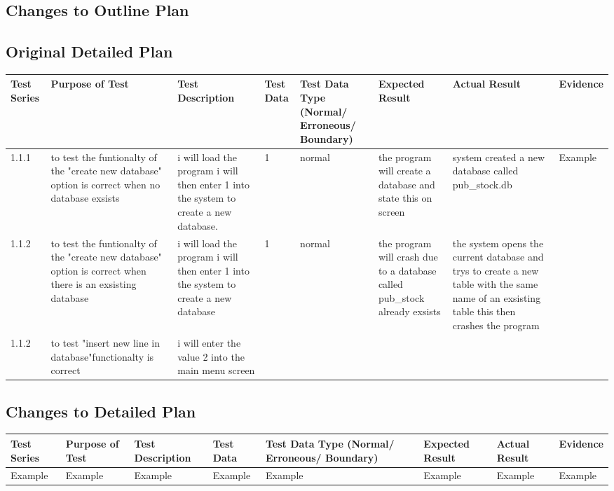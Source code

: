 \begin{landscape}
\subsection{Changes to Outline Plan}

\subsection{Original Detailed Plan}

\begin{center}
    \begin{longtable}{|p{1.5cm}|p{2.5cm}|p{2.5cm}|p{2cm}|p{2cm}|p{2cm}|p{2cm}|p{2cm}|}
        \hline
        \textbf{Test Series} & \textbf{Purpose of Test} & \textbf{Test Description} & \textbf{Test Data} & \textbf{Test Data Type (Normal/ Erroneous/ Boundary)} & \textbf{Expected Result} & \textbf{Actual Result} & \textbf{Evidence}\\ \hline
       1.1.1 & to test the funtionalty of the "create new database" option is correct when no database exsists & i will load the program i will then enter 1 into the system to create a new database. & 1 & normal & the program will create a database and state this on screen &system created a new database called pub_stock.db & Example \\ \hline
1.1.2 & to test the funtionalty of the "create new database" option is correct when there is an exsisting database  &  i will load the program i will then enter 1 into the system to create a new database & 1 & normal &the program will crash due to a database called pub_stock already exsists & the system opens the current database and trys to create a new table with the same name of an exsisting table this then crashes the program & \\ \hline
1.1.2 & to test "insert new line in database"functionalty is correct & i will enter the value 2 into the main menu screen

    \end{longtable}
\end{center}

\subsection{Changes to Detailed Plan}

\begin{center}
    \begin{longtable}{|p{1.5cm}|p{2.5cm}|p{2.5cm}|p{2cm}|p{2cm}|p{2cm}|p{2cm}|p{2cm}|}
        \hline
        \textbf{Test Series} & \textbf{Purpose of Test} & \textbf{Test Description} & \textbf{Test Data} & \textbf{Test Data Type (Normal/ Erroneous/ Boundary)} & \textbf{Expected Result} & \textbf{Actual Result} & \textbf{Evidence}\\ \hline
        Example & Example & Example & Example & Example & Example & Example & Example \\ \hline
    \end{longtable}
\end{center}


\end{landscape}
